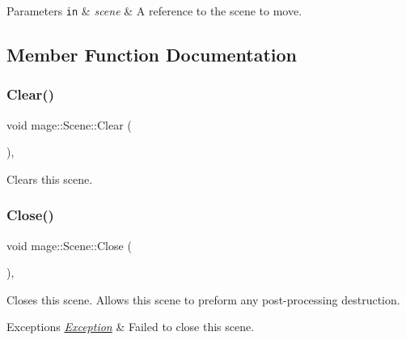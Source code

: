 \begin{DoxyParams}[1]{Parameters}
\mbox{\tt in}  & {\em scene} & A reference to the scene to move. \\
\hline
\end{DoxyParams}


\subsection{Member Function Documentation}
\hypertarget{classmage_1_1_scene_adf4a5b3885e34336caa5f145f55e01e1}{}\label{classmage_1_1_scene_adf4a5b3885e34336caa5f145f55e01e1} 
\subsubsection{\texorpdfstring{Clear()}{Clear()}}
{\footnotesize\ttfamily void mage\+::\+Scene\+::\+Clear (\begin{DoxyParamCaption}{ }\end{DoxyParamCaption})\hspace{0.3cm}{\ttfamily [private]}, {\ttfamily [noexcept]}}

Clears this scene. \hypertarget{classmage_1_1_scene_afcdedaac5ecab7dcbbb180426054aaa5}{}\label{classmage_1_1_scene_afcdedaac5ecab7dcbbb180426054aaa5} 
\subsubsection{\texorpdfstring{Close()}{Close()}}
{\footnotesize\ttfamily void mage\+::\+Scene\+::\+Close (\begin{DoxyParamCaption}{ }\end{DoxyParamCaption})\hspace{0.3cm}{\ttfamily [private]}, {\ttfamily [virtual]}}

Closes this scene. Allows this scene to preform any post-\/processing destruction.


\begin{DoxyExceptions}{Exceptions}
{\em \hyperlink{classmage_1_1_exception}{Exception}} & Failed to close this scene. \\
\hline
\end{DoxyExceptions}
\hypertarget{classmage_1_1_scene_ac936ab1a1795a263455e5a9c420e2928}{}\label{classmage_1_1_scene_ac936ab1a1795a263455e5a9c420e2928} 
